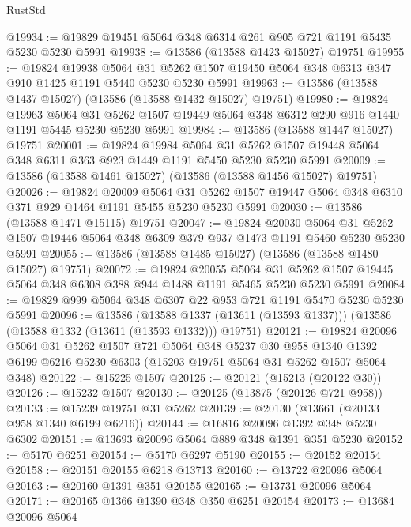 \begin{lexlean}{RustStd}
\begin{coremodule}
@19934 := @19829 @19451 @5064 @348 @6314 @261 @905 @721 @1191 @5435 @5230 @5230 @5991
@19938 := @13586 (@13588 @1423 @15027) @19751
@19955 := @19824
    @19938
    @5064
    @31
    @5262
    @1507
    @19450
    @5064
    @348
    @6313
    @347
    @910
    @1425
    @1191
    @5440
    @5230
    @5230
    @5991
@19963 := @13586 (@13588 @1437 @15027) (@13586 (@13588 @1432 @15027) @19751)
@19980 := @19824
    @19963
    @5064
    @31
    @5262
    @1507
    @19449
    @5064
    @348
    @6312
    @290
    @916
    @1440
    @1191
    @5445
    @5230
    @5230
    @5991
@19984 := @13586 (@13588 @1447 @15027) @19751
@20001 := @19824
    @19984
    @5064
    @31
    @5262
    @1507
    @19448
    @5064
    @348
    @6311
    @363
    @923
    @1449
    @1191
    @5450
    @5230
    @5230
    @5991
@20009 := @13586 (@13588 @1461 @15027) (@13586 (@13588 @1456 @15027) @19751)
@20026 := @19824
    @20009
    @5064
    @31
    @5262
    @1507
    @19447
    @5064
    @348
    @6310
    @371
    @929
    @1464
    @1191
    @5455
    @5230
    @5230
    @5991
@20030 := @13586 (@13588 @1471 @15115) @19751
@20047 := @19824
    @20030
    @5064
    @31
    @5262
    @1507
    @19446
    @5064
    @348
    @6309
    @379
    @937
    @1473
    @1191
    @5460
    @5230
    @5230
    @5991
@20055 := @13586 (@13588 @1485 @15027) (@13586 (@13588 @1480 @15027) @19751)
@20072 := @19824
    @20055
    @5064
    @31
    @5262
    @1507
    @19445
    @5064
    @348
    @6308
    @388
    @944
    @1488
    @1191
    @5465
    @5230
    @5230
    @5991
@20084 := @19829 @999 @5064 @348 @6307 @22 @953 @721 @1191 @5470 @5230 @5230 @5991
@20096 := @13586
    (@13588 @1337 (@13611 (@13593 @1337)))
    (@13586 (@13588 @1332 (@13611 (@13593 @1332))) @19751)
@20121 := @19824
    @20096
    @5064
    @31
    @5262
    @1507
    @721
    @5064
    @348
    @5237
    @30
    @958
    @1340
    @1392
    @6199
    @6216
    @5230
    @6303
    (@15203 @19751 @5064 @31 @5262 @1507 @5064 @348)
@20122 := @15225 @1507
@20125 := @20121 (@15213 (@20122 @30))
@20126 := @15232 @1507
@20130 := @20125 (@13875 (@20126 @721 @958))
@20133 := @15239 @19751 @31 @5262
@20139 := @20130 (@13661 (@20133 @958 @1340 @6199 @6216))
@20144 := @16816 @20096 @1392 @348 @5230 @6302
@20151 := @13693 @20096 @5064 @889 @348 @1391 @351 @5230
@20152 := @5170 @6251
@20154 := @5170 @6297 @5190
@20155 := @20152 @20154
@20158 := @20151 @20155 @6218 @13713
@20160 := @13722 @20096 @5064
@20163 := @20160 @1391 @351 @20155
@20165 := @13731 @20096 @5064
@20171 := @20165 @1366 @1390 @348 @350 @6251 @20154
@20173 := @13684 @20096 @5064

\end{coremodule}
\end{lexlean}
